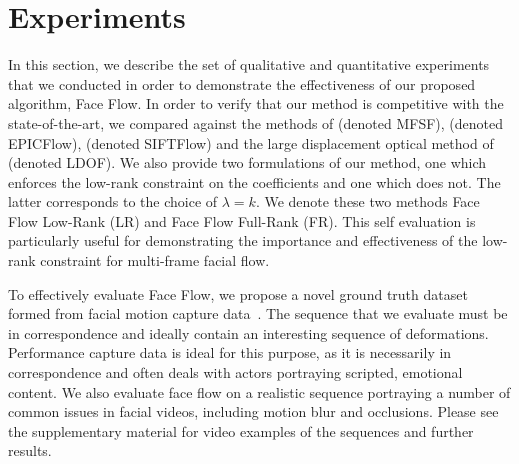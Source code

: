 \section{Experiments}\label{sec:experiments}
In this section, we describe the set of qualitative and quantitative experiments
that we conducted in order to demonstrate the effectiveness of our proposed algorithm,
Face Flow. In order to verify that our method is competitive with the state-of-the-art,
we compared against the methods of
\citet{garg2013variational} (denoted MFSF),
\citet{revaud2015epicflow} (denoted EPICFlow),
\citet{liu2011sift} (denoted SIFTFlow) and the large displacement
optical method of \citet{brox2011large} (denoted LDOF). We also provide two
formulations of our method, one which enforces the low-rank constraint on the coefficients
and one which does not. The latter corresponds to the choice of $\lambda=k$.
We denote these two methods Face Flow Low-Rank (LR) and Face Flow
Full-Rank (FR). This self evaluation is particularly useful for demonstrating the importance
and effectiveness of the low-rank constraint for multi-frame facial flow.

To effectively evaluate Face Flow, we propose a novel ground truth dataset formed
from facial motion capture data~\cite{zhang2004spacetime}. The sequence that we
evaluate must be in correspondence and ideally contain an interesting
sequence of deformations. Performance capture data is ideal for this purpose, as
it is necessarily in correspondence and often deals with actors portraying
scripted, emotional content. We also evaluate face flow on a realistic sequence
portraying a number of common issues in facial videos, including motion blur
and occlusions. Please see the supplementary material for
video examples of the sequences and further results.
